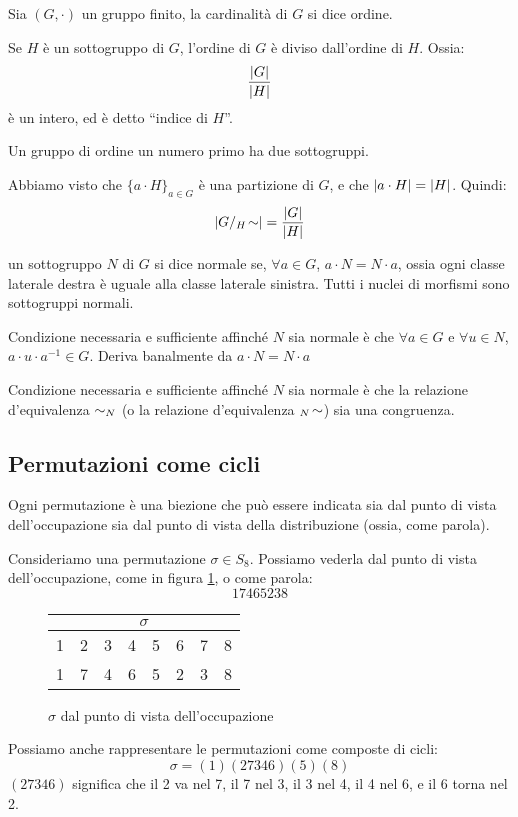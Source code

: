 \begin{theorem}
Sia $(G, \cdot)$ un gruppo finito, la cardinalit\`a di $G$ si dice ordine.

Se $H$ \`e un sottogruppo di $G$, l'ordine di $G$ \`e diviso dall'ordine di $H$. Ossia:
\[
\frac{\left\lvert{G}\right\rvert}{\left\lvert{H}\right\rvert}
\]
\`e un intero, ed \`e detto ``indice di $H$''.
\end{theorem}
\begin{oss}
Un gruppo di ordine un numero primo ha due sottogruppi.
\end{oss}
Abbiamo visto che $\{ a \cdot H\}_{a \in G}$ \`e una partizione di $G$, e che $\left\lvert{a \cdot H}\right\rvert = \left\lvert{H}\right\rvert$. Quindi:
\[
\left\lvert{G / {}_{H}\!\sim}\right\rvert = \frac{\left\lvert{G}\right\rvert}{\left\lvert{H}\right\rvert}
\]

\begin{defn}
un sottogruppo $N$ di $G$ si dice normale se, $\forall a \in G$, $a \cdot N = N \cdot a$, ossia ogni classe laterale destra \`e uguale alla classe laterale sinistra. Tutti i nuclei di morfismi sono sottogruppi normali.
\end{defn}
Condizione necessaria e sufficiente affinch\'e $N$ sia normale \`e che $\forall a \in G$ e $\forall u \in N$, $a \cdot u \cdot a^{-1} \in G$. Deriva banalmente da $a \cdot N = N \cdot a$

Condizione necessaria e sufficiente affinch\'e $N$ sia normale \`e che la relazione d'equivalenza $\sim_{N}$ (o la relazione d'equivalenza ${}_{N}\!\sim$) sia una congruenza.

\subsection{Permutazioni come cicli}

Ogni permutazione \`e una biezione che pu\`o essere indicata sia dal punto di vista dell'occupazione sia dal punto di vista della distribuzione (ossia, come parola).

Consideriamo una permutazione $\sigma \in S_8$. Possiamo vederla dal punto di vista dell'occupazione, come in figura \ref{fig:cicli_sigma_occupazione}, o come parola:
\[
17465238
\]
\begin{figure}[ht]
\centering
\begin{tabular}{*{8}{c}}
\multicolumn{8}{c}{$\sigma$} \\
\hline
1 & 2 & 3 & 4 & 5 & 6 & 7 & 8 \\
1 & 7 & 4 & 6 & 5 & 2 & 3 & 8
\end{tabular}
\caption{$\sigma$ dal punto di vista dell'occupazione\label{fig:cicli_sigma_occupazione}}
\end{figure}
Possiamo anche rappresentare le permutazioni come composte di cicli:
\[
\sigma = (1) (2 7 3 4 6) (5) (8)
\]
$(2 7 3 4 6)$ significa che il 2 va nel 7, il 7 nel 3, il 3 nel 4, il 4 nel 6, e il 6 torna nel 2.

